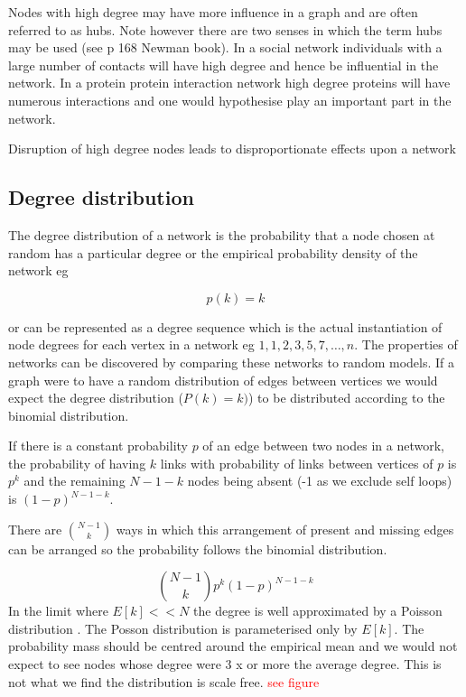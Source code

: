  Nodes with high degree may have more influence in a graph and are often referred to as hubs. Note however there are two senses in which the term hubs may be used (see p 168 Newman book\cite{newman2018networks}).  In a social network  individuals with a large number of contacts will have high degree and hence be influential in the network. In a protein protein interaction network high degree proteins will have numerous interactions and one would hypothesise play an important part in the network. 
 
 Disruption of high degree nodes leads to disproportionate effects upon a network \cite{jeong2001lethality} \cite{albert2000error} 

\subsection{Degree distribution}
\label{sec:degree distribution}
The degree distribution of a network is the probability that a node chosen at random has a particular degree or the empirical probability density of the network eg

\begin{equation}
    p(k) = k
\end{equation}

or can be represented as a degree sequence which is the actual instantiation of node degrees for each vertex in a network eg $1,1,2,3,5,7,\dots,n$. The properties of networks can be discovered by comparing these networks to random models. 
If a graph were to have a random distribution of edges between vertices we would expect the degree distribution ($P(k)=k)$) to be distributed according to the binomial distribution.  

If there is a constant probability $p$ of an edge between two nodes in a network, the probability of having $k$ links with probability of links between vertices of $p$ is $p^k$ and the remaining $N-1-k$ nodes being absent (-1 as we exclude self loops) is $(1-p)^{N-1-k}$.

There are $\binom{N-1}{k}$ ways in which this arrangement of present and missing edges can be arranged so the probability follows the binomial distribution.

\begin{equation}
   \binom{N-1}{k}        p^k (1-p)^{N-1-k}
   \label{Equation:BinomialDistributionForDegreeProbability}
\end{equation}
In the limit where $E[k] << N$ the degree is well approximated by a Poisson distribution \cite{barabasi2016network}. The Posson distribution is parameterised only by $E[k]$.  The probability mass should be centred around the empirical mean and we would not expect to see nodes whose degree were 3 x or more the average degree. This is not what we find the distribution is scale free.  
 \textcolor{red}{see figure}


